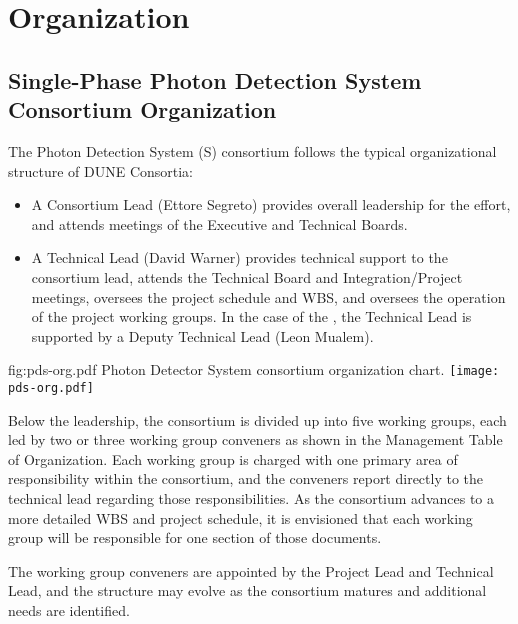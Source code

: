 \section{Organization}
\label{sec:fdsp-pd-org}

\subsection{Single-Phase Photon Detection System Consortium Organization}
\label{sec:fdsp-pd-org-consortium}


The Photon Detection System (S) consortium follows the typical organizational structure of DUNE Consortia:
\begin{itemize}
\item A Consortium Lead (Ettore Segreto) provides overall leadership for the effort, and attends meetings of the Executive and Technical Boards.
\item A Technical Lead (David Warner) provides technical support to the consortium lead, attends the Technical Board and Integration/Project meetings, oversees the project schedule and WBS, and oversees the operation of the project working groups.  In the case of the , the Technical Lead is supported by a Deputy Technical Lead (Leon Mualem).
\end{itemize}

\begin{dunefigure}{fig:pds-org.pdf}
{Photon Detector System consortium organization chart.}
 \texttt{[image: pds-org.pdf]}
\end{dunefigure}

Below the leadership, the consortium is divided up into five working groups, each led by two or three working group conveners as shown in the  Management Table of Organization.  Each working group is charged with one primary area of responsibility within the consortium, and the conveners report directly to the technical lead regarding those responsibilities.  As the consortium advances to a more detailed WBS and project schedule, it is envisioned that each working group will be responsible for one section of those documents.

The working group conveners are appointed by the  Project Lead and Technical Lead, and the structure may evolve as the consortium matures and additional needs are identified. 

